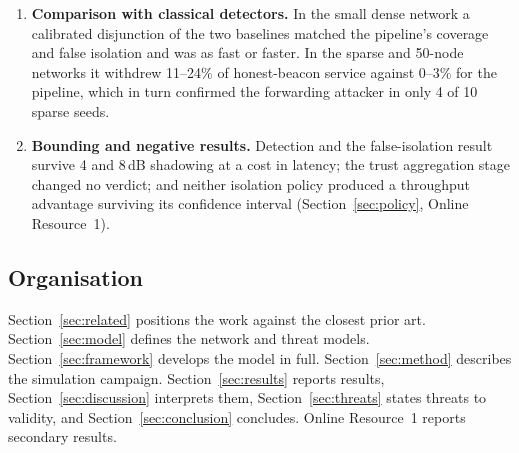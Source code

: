 \begin{enumerate}
\item \textbf{Comparison with classical detectors.} In the small dense
      network a calibrated disjunction of the two baselines matched the
      pipeline's coverage and false isolation and was as fast or faster. In
      the sparse and 50-node networks it withdrew 11--24\% of honest-beacon
      service against 0--3\% for the pipeline, which in turn confirmed the
      forwarding attacker in only 4 of 10 sparse seeds.

\item \textbf{Bounding and negative results.} Detection and the
      false-isolation result survive 4 and 8\,dB shadowing at a cost in
      latency; the trust aggregation stage changed no verdict; and neither
      isolation policy produced a throughput advantage surviving its
      confidence interval (Section~\ref{sec:policy}, Online Resource~1).
\end{enumerate}

\subsection{Organisation}

Section~\ref{sec:related} positions the work against the closest prior art.
Section~\ref{sec:model} defines the network and threat models.
Section~\ref{sec:framework} develops the model in full.
Section~\ref{sec:method} describes the simulation campaign.
Section~\ref{sec:results} reports results, Section~\ref{sec:discussion}
interprets them, Section~\ref{sec:threats} states threats to validity, and
Section~\ref{sec:conclusion} concludes. Online Resource~1
reports secondary results.

